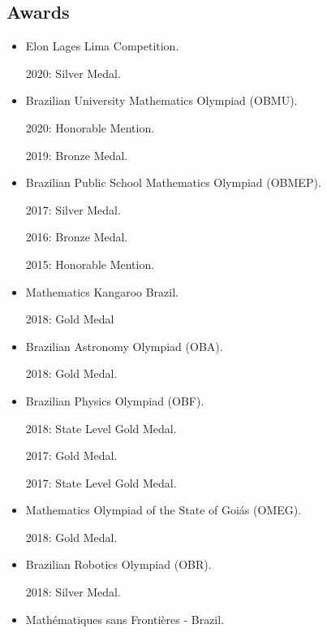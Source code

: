 \documentclass[a4paper]{article}
\begin{document}
\begin{paracol}{2}
\section*{\faAward \; Awards}
\begin{minipage}[t]{0.33\textwidth}
\begin{itemize}
\item Elon Lages Lima Competition.

2020: Silver Medal.

\item Brazilian University Mathematics \newline Olympiad (OBMU).

2020: Honorable Mention.

2019: Bronze Medal.

\item Brazilian Public School Mathematics \newline Olympiad (OBMEP).

2017: Silver Medal.

2016: Bronze Medal.

2015: Honorable Mention.

\item Mathematics Kangaroo Brazil.

2018: Gold Medal


\item Brazilian Astronomy Olympiad (OBA).

2018: Gold Medal.
\end{itemize}
\end{minipage}
\begin{minipage}[t]{0.33\textwidth}
\begin{itemize}
\item Brazilian Physics Olympiad (OBF).

2018: State Level Gold Medal.

2017: Gold Medal.

2017: State Level Gold Medal.

\item Mathematics Olympiad of the State of Goiás (OMEG).

2018: Gold Medal.

\item Brazilian Robotics Olympiad (OBR).

2018: Silver Medal.

\item Mathématiques sans Frontières - Brazil.


\end{itemize}
\end{minipage}
\end{paracol}
\end{document}
